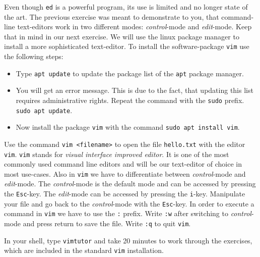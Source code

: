 \documentclass{dcbl/challenge}
\begin{document}
\begin{aufgabe}
    Even though \texttt{ed} is a powerful program, its use is limited and no longer state of the art.
    The previous exercise was meant to demonstrate to you, that command-line text-editors work in two different modes: \textit{control}-mode and \textit{edit}-mode.
    Keep that in mind in our next exercise.
    We will use the linux package manager to install a more sophisticated text-editor.
    To install the software-package \texttt{vim} use the following steps:
    \begin{itemize}
        \item Type \texttt{apt update} to update the package list of the \texttt{apt} package manager.
        \item You will get an error message. This is due to the fact, that updating this list requires administrative rights. Repeat the command with the \texttt{sudo} prefix. \texttt{sudo apt update}.
        \item Now install the package \texttt{vim} with the command \texttt{sudo apt install vim}.
    \end{itemize}
\end{aufgabe}

\begin{aufgabe}
    Use the command \texttt{vim <filename>} to open the file \texttt{hello.txt} with the editor \texttt{vim}.
    \texttt{vim} stands for \textit{visual interface improved editor}. 
    It is one of the most commonly used command line editors and will be our text-editor of choice in most use-cases.
    Also in \texttt{vim} we have to differentiate between \textit{control}-mode and \textit{edit}-mode.
    The \textit{control}-mode is the default mode and can be accessed by pressing the \texttt{Esc}-key. 
    The \textit{edit}-mode can be accessed by pressing the \texttt{i}-key.
    Manipulate your file and go back to the \textit{control}-mode with the \texttt{Esc}-key.
    In order to execute a command in \texttt{vim} we have to use the \texttt{:} prefix.
    Write \texttt{:w} after switching to \textit{control}-mode and press return to save the file.
    Write \texttt{:q} to quit \texttt{vim}.
\end{aufgabe}

\begin{aufgabe}
    In your shell, type \texttt{vimtutor} and take 20 minutes to work through the exercises, which are included in the standard \texttt{vim} installation.
\end{aufgabe}
\end{document}

